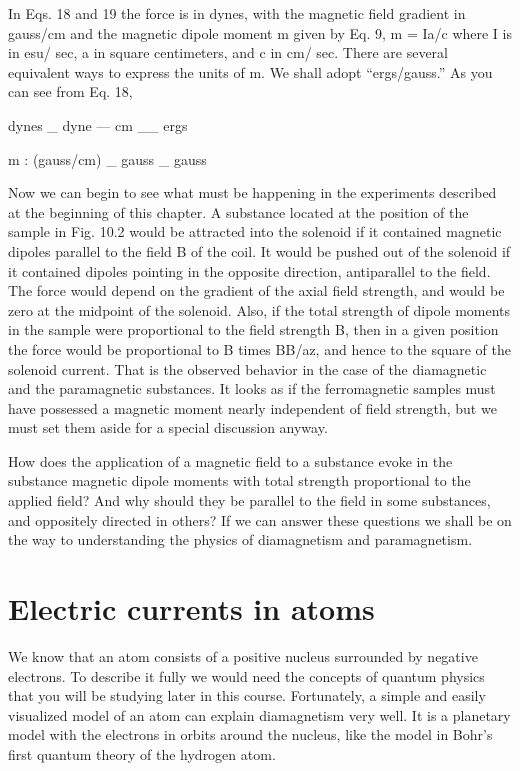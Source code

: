 {In Eqs. 18 and 19 the force is in dynes, with the magnetic field
gradient in gauss/cm and the magnetic dipole moment m given by
Eq. 9, m = Ia/c where I is in esu/ sec, a in square centimeters, and c
in cm/ sec. There are several equivalent ways to express the units
of m. We shall adopt ``ergs/gauss.'' As you can see from Eq. 18,

dynes _ dyne --- cm __ ergs

m : (gauss/cm) _ gauss _ gauss

Now we can begin to see what must be happening in the experiments
described at the beginning of this chapter. A substance
located at the position of the sample in Fig. 10.2 would be attracted
into the solenoid if it contained magnetic dipoles parallel to the field
B of the coil. It would be pushed out of the solenoid if it contained
dipoles pointing in the opposite direction, antiparallel to the field.
The force would depend on the gradient of the axial field strength,
and would be zero at the midpoint of the solenoid. Also, if the total
strength of dipole moments in the sample were proportional to the
field strength B, then in a given position the force would be proportional
to B times BB/az, and hence to the square of the solenoid 
current. That is the observed behavior in the case of the diamagnetic
and the paramagnetic substances. It looks as if the ferromagnetic
samples must have possessed a magnetic moment nearly independent
of field strength, but we must set them aside for a special discussion
anyway.

How does the application of a magnetic field to a substance evoke
in the substance magnetic dipole moments with total strength proportional
to the applied field? And why should they be parallel to
the field in some substances, and oppositely directed in others? If
we can answer these questions we shall be on the way to understanding
the physics of diamagnetism and paramagnetism.

 

 

  

 

 

\section{Electric currents in atoms}

We know that an atom consists of a positive nucleus surrounded
by negative electrons. To describe it fully we would need the concepts
of quantum physics that you will be studying later in this
course. Fortunately, a simple and easily visualized model of an
atom can explain diamagnetism very well. It is a planetary model
with the electrons in orbits around the nucleus, like the model in
Bohr's first quantum theory of the hydrogen atom.

}
